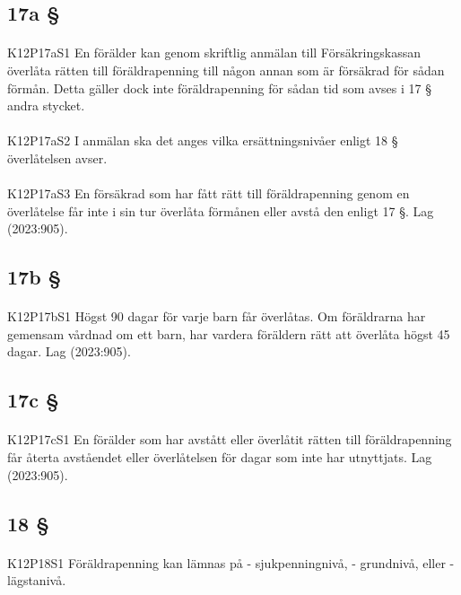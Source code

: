 \documentclass[a4paper,notitlepage,openany,10pt]{book}
\begin{document}
\subsection*{17a §}
\paragraph*{}
{\tiny K12P17aS1}
En förälder kan genom skriftlig anmälan till Försäkringskassan överlåta rätten till föräldrapenning till någon annan som är försäkrad för sådan förmån. Detta gäller dock inte föräldrapenning för sådan tid som avses i 17 § andra stycket.
\paragraph*{}
{\tiny K12P17aS2}
I anmälan ska det anges vilka ersättningsnivåer enligt 18 § överlåtelsen avser.
\paragraph*{}
{\tiny K12P17aS3}
En försäkrad som har fått rätt till föräldrapenning genom en överlåtelse får inte i sin tur överlåta förmånen eller avstå den enligt 17 §.
Lag (2023:905).
\subsection*{17b §}
\paragraph*{}
{\tiny K12P17bS1}
Högst 90 dagar för varje barn får överlåtas. Om föräldrarna har gemensam vårdnad om ett barn, har vardera föräldern rätt att överlåta högst 45 dagar.
Lag (2023:905).
\subsection*{17c §}
\paragraph*{}
{\tiny K12P17cS1}
En förälder som har avstått eller överlåtit rätten till föräldrapenning får återta avståendet eller överlåtelsen för dagar som inte har utnyttjats.
Lag (2023:905).
\subsection*{18 §}
\paragraph*{}
{\tiny K12P18S1}
Föräldrapenning kan lämnas på
\newline - sjukpenningnivå,
\newline - grundnivå, eller
\newline - lägstanivå.
\end{document}
